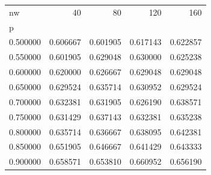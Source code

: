 \begin{tabular}{lrrrr}
\toprule
nw & 40 & 80 & 120 & 160 \\
p &  &  &  &  \\
\midrule
0.500000 & 0.606667 & 0.601905 & 0.617143 & 0.622857 \\
0.550000 & 0.601905 & 0.629048 & 0.630000 & 0.625238 \\
0.600000 & 0.620000 & 0.626667 & 0.629048 & 0.629048 \\
0.650000 & 0.629524 & 0.635714 & 0.630952 & 0.629524 \\
0.700000 & 0.632381 & 0.631905 & 0.626190 & 0.638571 \\
0.750000 & 0.631429 & 0.637143 & 0.632381 & 0.635238 \\
0.800000 & 0.635714 & 0.636667 & 0.638095 & 0.642381 \\
0.850000 & 0.651905 & 0.646667 & 0.641429 & 0.643333 \\
0.900000 & 0.658571 & 0.653810 & 0.660952 & 0.656190 \\
\bottomrule
\end{tabular}
